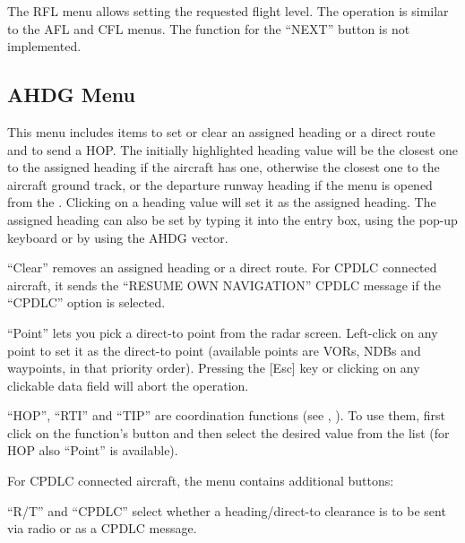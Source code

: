 \documentclass[a4paper,oneside,11pt]{memoir}
\begin{document}
The RFL menu allows setting the requested flight level. The operation is similar to the AFL and CFL menus. The function for the “NEXT” button is not implemented.

\subsection{AHDG Menu}
\label{menu:ahdg}


This menu includes items to set or clear an assigned heading or a direct route and to send a HOP. The initially highlighted heading value will be the closest one to the assigned heading if the aircraft has one, otherwise the closest one to the aircraft ground track, or the departure runway heading if the menu is opened from the . Clicking on a heading value will set it as the assigned heading. The assigned heading can also be set by typing it into the entry box, using the pop-up keyboard or by using the AHDG vector.

\bigskip

“Clear” removes an assigned heading or a direct route. For CPDLC connected aircraft, it sends the “RESUME OWN NAVIGATION” CPDLC message if the “CPDLC” option is selected.

\bigskip

“Point” lets you pick a direct-to point from the radar screen. Left-click on any point to set it as the direct-to point (available points are VORs, NDBs and waypoints, in that priority order). Pressing the [Esc] key or clicking on any clickable data field will abort the operation.

\bigskip

“HOP”, “RTI” and “TIP” are coordination functions (see , ). To use them, first click on the function’s button and then select the desired value from the list (for HOP also “Point” is available).

\bigskip


\bigskip

For CPDLC connected aircraft, the menu contains additional buttons:

\bigskip

“R/T” and “CPDLC” select whether a heading/direct-to clearance is to be sent via radio or as a CPDLC message.

\bigskip
\end{document}
